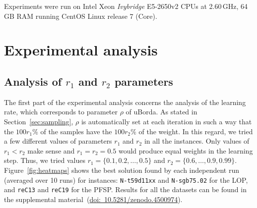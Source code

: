 \documentclass[sigconf,dvipsnames]{acmart}
\newcommand{\supplement}{\href{http://doi.org/10.5281/zenodo.4500974}{doi:~10.5281/zenodo.4500974}}
\begin{document}
Experiments were run on Intel Xeon \emph{Ivybridge} E5-2650v2 CPUs at
2.60\,GHz, 64\,GB RAM running CentOS Linux release 7 (Core).

\section{Experimental analysis}\label{sec:analysis}

\subsection{Analysis of $r_1$ and $r_2$ parameters}

The first part of the experimental analysis concerns the analysis of the learning rate, which corresponds to parameter $\rho$ of uBorda. As stated in Section~\ref{sec:sampling}, $\rho$ is automatically set at each iteration in such a way that the $100r_1\%$ of the samples have the $100r_2\%$ of the weight. In this regard, we tried a few different values of parameters $r_1$ and $r_2$ in all the instances. Only values of $r_1 < r_2$ make sense and $r_1 = r_2 = 0.5$ would produce equal weights in the learning step. Thus, we tried values $r_1 = \{0.1, 0.2, \dotsc, 0.5\}$ and $r_2 = \{0.6,\dotsc, 0.9, 0.99\}$. Figure~\ref{fig:heatmaps} shows the best solution found by each independent run (averaged over 10 runs) for instances: \texttt{N-t59d11xx} and \texttt{N-sgb75.02} for the LOP, and \texttt{reC13} and \texttt{reC19} for the PFSP. Results for all the datasets can be found in the supplemental material~(\supplement).
\end{document}
